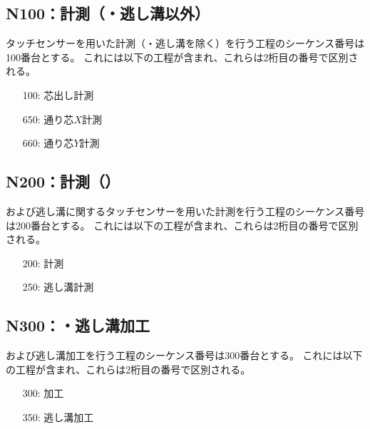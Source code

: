 \subsection{N100：計測（\dimple ・逃し溝以外）}
タッチセンサーを用いた計測（\dimple ・逃し溝を除く）を行う工程のシーケンス番号は100番台とする。
これには以下の工程が含まれ、これらは2桁目の番号で区別される。
\begin{enumerate}
\item[100:] 芯出し計測
\item[650:] 通り芯$X$計測
\item[660:] 通り芯$Y$計測
\end{enumerate}


\subsection{N200：計測（\dimple）}
\expandafterindex{\dimplekana@\dimple}\dimple および逃し溝に関するタッチセンサーを用いた計測を行う工程のシーケンス番号は200番台とする。
これには以下の工程が含まれ、これらは2桁目の番号で区別される。
\begin{enumerate}
\item[200:] \dimple 計測
\item[250:] 逃し溝計測
\end{enumerate}


\subsection{N300：\dimple ・逃し溝加工}
\dimple および逃し溝加工を行う工程のシーケンス番号は300番台とする。
これには以下の工程が含まれ、これらは2桁目の番号で区別される。
\begin{enumerate}
\item[300:] \dimple 加工
\item[350:] 逃し溝加工
\end{enumerate}


